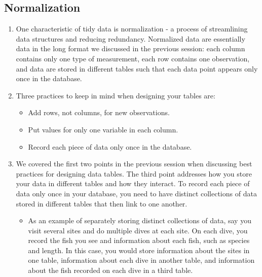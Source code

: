 \documentclass[
]{book}
\providecommand{\tightlist}{%
  \setlength{\itemsep}{0pt}\setlength{\parskip}{0pt}}
\begin{document}
\hypertarget{normalization}{%
\subsection{Normalization}\label{normalization}}

\begin{enumerate}
\def\labelenumi{\arabic{enumi}.}
\item
  One characteristic of tidy data is normalization - a process of streamlining data structures and reducing redundancy. Normalized data are essentially data in the long format we discussed in the previous session: each column contains only one type of measurement, each row contains one observation, and data are stored in different tables such that each data point appears only once in the database.
\item
  Three practices to keep in mind when designing your tables are:

  \begin{itemize}
  \item
    Add rows, not columns, for new observations.
  \item
    Put values for only one variable in each column.
  \item
    Record each piece of data only once in the database.
  \end{itemize}
\item
  We covered the first two points in the previous session when discussing best practices for designing data tables. The third point addresses how you store your data in different tables and how they interact. To record each piece of data only once in your database, you need to have distinct collections of data stored in different tables that then link to one another.

  \begin{itemize}
  \tightlist
  \item
    As an example of separately storing distinct collections of data, say you visit several sites and do multiple dives at each site. On each dive, you record the fish you see and information about each fish, such as species and length. In this case, you would store information about the sites in one table, information about each dive in another table, and information about the fish recorded on each dive in a third table.


\end{itemize}
\end{enumerate}
\end{document}
